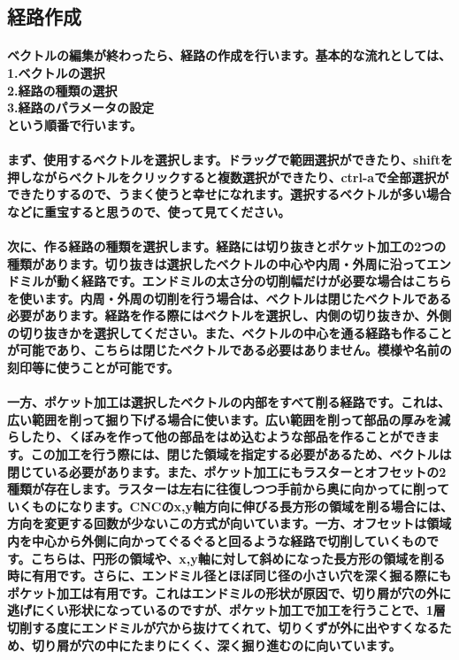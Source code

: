 \documentclass[b5paper, 9pt, twocolumn, titlepage,openany]{jsbook}%
\begin{document}
\subsection{経路作成}
\paragraph{ベクトルの編集が終わったら、経路の作成を行います。基本的な流れとしては、\\
1.ベクトルの選択\\
2.経路の種類の選択\\
3.経路のパラメータの設定\\
という順番で行います。}
\paragraph{まず、使用するベクトルを選択します。ドラッグで範囲選択ができたり、shiftを押しながらベクトルをクリックすると複数選択ができたり、ctrl-aで全部選択ができたりするので、うまく使うと幸せになれます。選択するベクトルが多い場合などに重宝すると思うので、使って見てください。}
\paragraph{次に、作る経路の種類を選択します。経路には切り抜きとポケット加工の2つの種類があります。切り抜きは選択したベクトルの中心や内周・外周に沿ってエンドミルが動く経路です。エンドミルの太さ分の切削幅だけが必要な場合はこちらを使います。内周・外周の切削を行う場合は、ベクトルは閉じたベクトルである必要があります。経路を作る際にはベクトルを選択し、内側の切り抜きか、外側の切り抜きかを選択してください。また、ベクトルの中心を通る経路も作ることが可能であり、こちらは閉じたベクトルである必要はありません。模様や名前の刻印等に使うことが可能です。}
\paragraph{一方、ポケット加工は選択したベクトルの内部をすべて削る経路です。これは、広い範囲を削って掘り下げる場合に使います。広い範囲を削って部品の厚みを減らしたり、くぼみを作って他の部品をはめ込むような部品を作ることができます。この加工を行う際には、閉じた領域を指定する必要があるため、ベクトルは閉じている必要があります。また、ポケット加工にもラスターとオフセットの2種類が存在します。ラスターは左右に往復しつつ手前から奥に向かってに削っていくものになります。CNCのx,y軸方向に伸びる長方形の領域を削る場合には、方向を変更する回数が少ないこの方式が向いています。一方、オフセットは領域内を中心から外側に向かってぐるぐると回るような経路で切削していくものです。こちらは、円形の領域や、x,y軸に対して斜めになった長方形の領域を削る時に有用です。さらに、エンドミル径とほぼ同じ径の小さい穴を深く掘る際にもポケット加工は有用です。これはエンドミルの形状が原因で、切り屑が穴の外に逃げにくい形状になっているのですが、ポケット加工で加工を行うことで、1層切削する度にエンドミルが穴から抜けてくれて、切りくずが外に出やすくなるため、切り屑が穴の中にたまりにくく、深く掘り進むのに向いています。}
\end{document}
